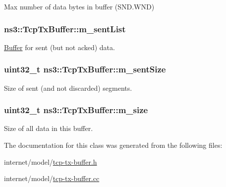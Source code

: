 Max number of data bytes in buffer (S\+N\+D.\+W\+ND) 

\subsubsection[{\texorpdfstring{m\+\_\+sent\+List}{m_sentList}}]{ ns3\+::\+Tcp\+Tx\+Buffer\+::m\+\_\+sent\+List\hspace{0.3cm}{\ttfamily [private]}}\hypertarget{classns3_1_1TcpTxBuffer_ae131f4743f4537f3606db664874440e5}{}\label{classns3_1_1TcpTxBuffer_ae131f4743f4537f3606db664874440e5}


\hyperlink{classns3_1_1Buffer}{Buffer} for sent (but not acked) data. 

\subsubsection[{\texorpdfstring{m\+\_\+sent\+Size}{m_sentSize}}]{\setlength{\rightskip}{0pt plus 5cm}uint32\+\_\+t ns3\+::\+Tcp\+Tx\+Buffer\+::m\+\_\+sent\+Size\hspace{0.3cm}{\ttfamily [private]}}\hypertarget{classns3_1_1TcpTxBuffer_ae45302ec0a3b3d757b0f3ad85e88e363}{}\label{classns3_1_1TcpTxBuffer_ae45302ec0a3b3d757b0f3ad85e88e363}


Size of sent (and not discarded) segments. 

\subsubsection[{\texorpdfstring{m\+\_\+size}{m_size}}]{\setlength{\rightskip}{0pt plus 5cm}uint32\+\_\+t ns3\+::\+Tcp\+Tx\+Buffer\+::m\+\_\+size\hspace{0.3cm}{\ttfamily [private]}}\hypertarget{classns3_1_1TcpTxBuffer_ace81d07d65ea00d9609dcc65a926564c}{}\label{classns3_1_1TcpTxBuffer_ace81d07d65ea00d9609dcc65a926564c}


Size of all data in this buffer. 



The documentation for this class was generated from the following files\+:\begin{DoxyCompactItemize}
\item 
internet/model/\hyperlink{tcp-tx-buffer_8h}{tcp-\/tx-\/buffer.\+h}\item 
internet/model/\hyperlink{tcp-tx-buffer_8cc}{tcp-\/tx-\/buffer.\+cc}\end{DoxyCompactItemize}
